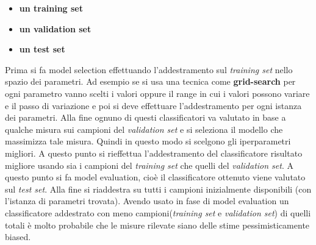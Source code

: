 \begin{itemize}
\item \textbf{un training set}
\item \textbf{un validation set}
\item \textbf{un test set}
\end{itemize} 
Prima si fa model selection effettuando l'addestramento sul \textit{training set} nello spazio dei parametri. Ad esempio se si usa una tecnica come \textbf{grid-search} per ogni parametro vanno scelti i valori oppure il range in cui i valori possono variare e il passo di variazione e poi si deve effettuare l'addestramento per ogni istanza dei parametri. Alla fine ognuno di questi classificatori va valutato in base a qualche misura sui campioni del \textit{validation set} e si seleziona il modello che massimizza tale misura. Quindi in questo modo si scelgono gli iperparametri migliori. A questo punto si rieffettua l'addestramento del classificatore risultato migliore usando sia i campioni del \textit{training set} che quelli del \textit{validation set}. A questo punto si fa model evaluation, cioè il classificatore ottenuto viene valutato sul \textit{test set}. Alla fine si riaddestra su tutti i campioni inizialmente disponibili (con l'istanza di parametri trovata). Avendo usato in fase di model evaluation un classificatore addestrato con meno campioni(\textit{training set} e \textit{validation set}) di quelli totali è molto probabile che le misure rilevate siano delle stime pessimisticamente biased. 

